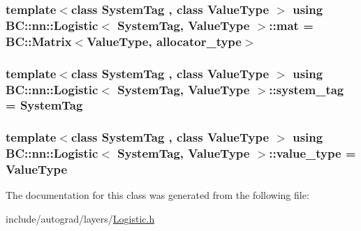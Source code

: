 \subsubsection[{\texorpdfstring{mat}{mat}}]{\setlength{\rightskip}{0pt plus 5cm}template$<$class System\+Tag , class Value\+Type $>$ using {\bf B\+C\+::nn\+::\+Logistic}$<$ System\+Tag, Value\+Type $>$\+::{\bf mat} =  {\bf B\+C\+::\+Matrix}$<$Value\+Type, {\bf allocator\+\_\+type}$>$}\hypertarget{classBC_1_1nn_1_1Logistic_ad65129493265072dc1083ea1e8dabc12}{}\label{classBC_1_1nn_1_1Logistic_ad65129493265072dc1083ea1e8dabc12}
\subsubsection[{\texorpdfstring{system\+\_\+tag}{system_tag}}]{\setlength{\rightskip}{0pt plus 5cm}template$<$class System\+Tag , class Value\+Type $>$ using {\bf B\+C\+::nn\+::\+Logistic}$<$ System\+Tag, Value\+Type $>$\+::{\bf system\+\_\+tag} =  System\+Tag}\hypertarget{classBC_1_1nn_1_1Logistic_a7c4cfbab1cbfb49d3842f4eec0b9f67e}{}\label{classBC_1_1nn_1_1Logistic_a7c4cfbab1cbfb49d3842f4eec0b9f67e}
\subsubsection[{\texorpdfstring{value\+\_\+type}{value_type}}]{\setlength{\rightskip}{0pt plus 5cm}template$<$class System\+Tag , class Value\+Type $>$ using {\bf B\+C\+::nn\+::\+Logistic}$<$ System\+Tag, Value\+Type $>$\+::{\bf value\+\_\+type} =  Value\+Type}\hypertarget{classBC_1_1nn_1_1Logistic_a06cf2a7fa68ff21ced567a9fc1b1e8f3}{}\label{classBC_1_1nn_1_1Logistic_a06cf2a7fa68ff21ced567a9fc1b1e8f3}


The documentation for this class was generated from the following file\+:\begin{DoxyCompactItemize}
\item 
include/autograd/layers/\hyperlink{autograd_2layers_2Logistic_8h}{Logistic.\+h}\end{DoxyCompactItemize}
